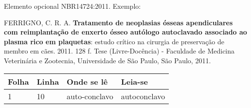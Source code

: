 
\begin{errata}

    Elemento opcional NBR14724:2011. Exemplo:
    
    \vspace{\onelineskip}
    
    FERRIGNO, C. R. A. \textbf{Tratamento de neoplasias ósseas apendiculares com
    reimplantação de enxerto ósseo autólogo autoclavado associado ao plasma
    rico em plaquetas}: estudo crítico na cirurgia de preservação de membro em
    cães. 2011. 128 f. Tese (Livre-Docência) - Faculdade de Medicina Veterinária e
    Zootecnia, Universidade de São Paulo, São Paulo, 2011.
    
    \begin{table}[H]
        \center
        \footnotesize
        \begin{tabular}{|p{1.4cm}|p{1cm}|p{3cm}|p{3cm}|}
            \hline
            \textbf{Folha}  & \textbf{Linha}    & \textbf{Onde se lê}   & \textbf{Leia-se} \\
            \hline
            1               & 10                & auto-conclavo         & autoconclavo \\
            \hline
        \end{tabular}
    \end{table}
    
\end{errata}